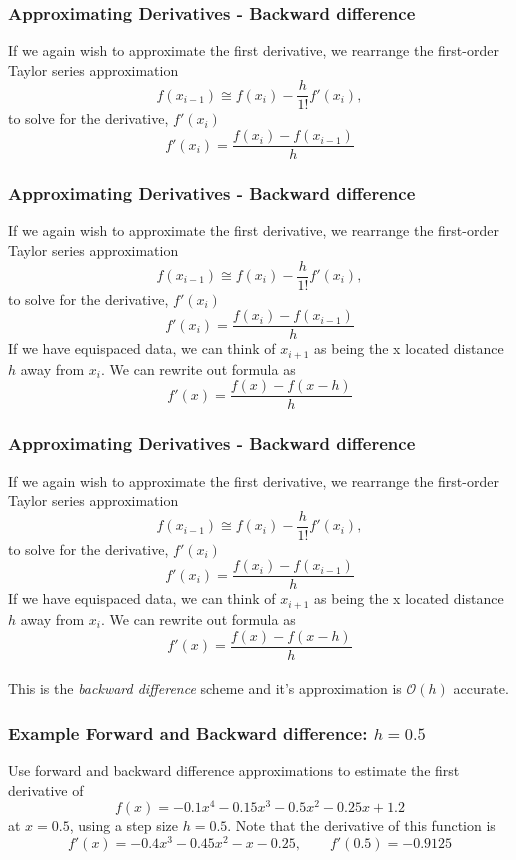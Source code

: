 \documentclass{if-beamer}
\begin{document}
\begin{frame}[t]
\frametitle{Approximating Derivatives - Backward difference}
If we again wish to approximate the first derivative, we rearrange the first-order Taylor series approximation
$$f(x_{i-1}) \cong f(x_i)- \frac{h}{1!}f'(x_i),$$
to solve for the derivative, $f'(x_i)$
$$f'(x_i) = \frac{f(x_{i})-f(x_{i-1})}{h} $$
\end{frame}

\begin{frame}[t]
\frametitle{Approximating Derivatives - Backward difference}
If we again wish to approximate the first derivative, we rearrange the first-order Taylor series approximation
$$f(x_{i-1}) \cong f(x_i)- \frac{h}{1!}f'(x_i),$$
to solve for the derivative, $f'(x_i)$
$$f'(x_i) = \frac{f(x_{i})-f(x_{i-1})}{h} $$
If we have equispaced data, we can think of $x_{i+1}$ as being the x located distance $h$ away from $x_i$. We can rewrite out formula as
$$f'(x) = \frac{f(x)-f(x-h)}{h}  $$
\end{frame}

\begin{frame}[t]
\frametitle{Approximating Derivatives - Backward difference}
If we again wish to approximate the first derivative, we rearrange the first-order Taylor series approximation
$$f(x_{i-1}) \cong f(x_i)- \frac{h}{1!}f'(x_i),$$
to solve for the derivative, $f'(x_i)$
$$f'(x_i) = \frac{f(x_{i})-f(x_{i-1})}{h} $$
If we have equispaced data, we can think of $x_{i+1}$ as being the x located distance $h$ away from $x_i$. We can rewrite out formula as
$$f'(x) = \frac{f(x)-f(x-h)}{h}  $$
\\\vspace{10pt}
This is the \textit{backward difference} scheme and it's approximation is $\mathcal{O}(h)$ accurate.
\end{frame}



\begin{frame}[t]
\frametitle{Example Forward and Backward difference: $h= 0.5$}
Use forward and backward difference approximations to estimate the first derivative of
$$f(x) = -0.1x^4-0.15x^3-0.5x^2-0.25x+1.2 $$
at $x=0.5$, using a step size $h = 0.5$. Note that the derivative of this function is
$$f'(x) = -0.4x^3-0.45x^2-x-0.25, \qquad f'(0.5) = -0.9125$$
\end{frame}
\end{document}
